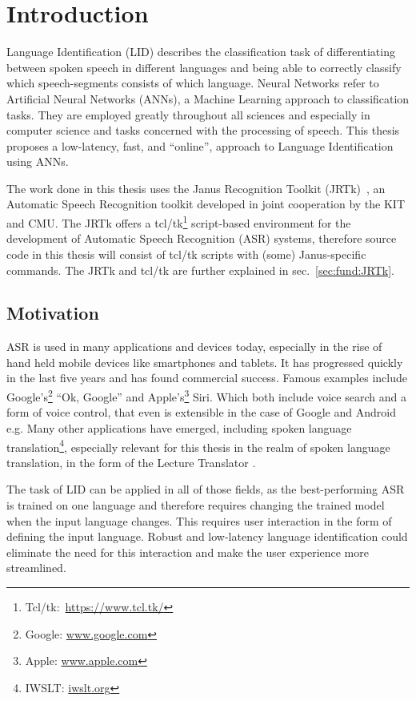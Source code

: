 \chapter{Introduction}
\label{ch:Introduction}
Language Identification (LID) describes the classification task of differentiating between spoken speech in different languages and being able to correctly classify which speech-segments consists of which language.  Neural Networks refer to Artificial Neural Networks (ANNs), a Machine Learning approach to classification tasks. They are employed greatly throughout all sciences and especially in computer science and tasks concerned with the processing of speech. This thesis proposes a low-latency, fast, and ``online'', approach to Language Identification using ANNs.

The work done in this thesis uses the Janus Recognition Toolkit (JRTk)~\cite{woszczyna1994janus}, an Automatic Speech Recognition toolkit developed in joint cooperation by the KIT and CMU. The JRTk offers a tcl/tk\footnote{Tcl/tk:~\url{https://www.tcl.tk/}} script-based environment for the development of Automatic Speech Recognition (ASR) systems, therefore source code in this thesis will consist of tcl/tk scripts with (some) Janus-specific commands. The JRTk and tcl/tk are further explained in sec.~\ref{sec:fund:JRTk}.

\section{Motivation}
\label{sec:Introduction:Motivation}
ASR is used in many applications and devices today, especially in the rise of hand held mobile devices like smartphones and tablets. It has progressed quickly in the last five years and has found commercial success. Famous examples include Google's\footnote{Google: \url{www.google.com}} ``Ok, Google'' and Apple's\footnote{Apple: \url{www.apple.com}} Siri. Which both include voice search\cite{franz2008voice} and a form of voice control, that even is extensible in the case of Google and Android e.g\cite{voicecontrol2014}. Many other applications have emerged, including spoken language translation\footnote{IWSLT: \url{iwslt.org}}, especially relevant for this thesis in the realm of spoken language translation, in the form of the Lecture Translator\cite{lecturetranslator2016} .

The task of LID can be applied in all of those fields, as the best-performing ASR is trained on one language and therefore requires changing the trained model when the input language changes. This requires user interaction in the form of defining the input language. Robust and low-latency language identification could eliminate the need for this interaction and make the user experience more streamlined.

